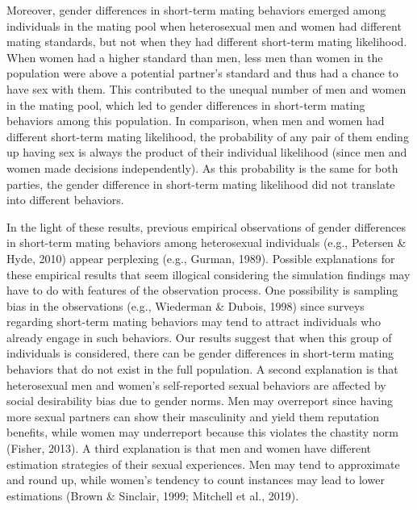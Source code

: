 \documentclass[
  12pt,
]{article}
\begin{document}
Moreover, gender differences in short-term mating behaviors emerged
among individuals in the mating pool when heterosexual men and women had
different mating standards, but not when they had different short-term
mating likelihood. When women had a higher standard than men, less men
than women in the population were above a potential partner's standard
and thus had a chance to have sex with them. This contributed to the
unequal number of men and women in the mating pool, which led to gender
differences in short-term mating behaviors among this population. In
comparison, when men and women had different short-term mating
likelihood, the probability of any pair of them ending up having sex is
always the product of their individual likelihood (since men and women
made decisions independently). As this probability is the same for both
parties, the gender difference in short-term mating likelihood did not
translate into different behaviors.

In the light of these results, previous empirical observations of gender
differences in short-term mating behaviors among heterosexual
individuals (e.g., Petersen \& Hyde, 2010) appear perplexing (e.g.,
Gurman, 1989). Possible explanations for these empirical results that
seem illogical considering the simulation findings may have to do with
features of the observation process. One possibility is sampling bias in
the observations (e.g., Wiederman \& Dubois, 1998) since surveys
regarding short-term mating behaviors may tend to attract individuals
who already engage in such behaviors. Our results suggest that when this
group of individuals is considered, there can be gender differences in
short-term mating behaviors that do not exist in the full population. A
second explanation is that heterosexual men and women's self-reported
sexual behaviors are affected by social desirability bias due to gender
norms. Men may overreport since having more sexual partners can show
their masculinity and yield them reputation benefits, while women may
underreport because this violates the chastity norm (Fisher, 2013). A
third explanation is that men and women have different estimation
strategies of their sexual experiences. Men may tend to approximate and
round up, while women's tendency to count instances may lead to lower
estimations (Brown \& Sinclair, 1999; Mitchell et al., 2019).
\end{document}
